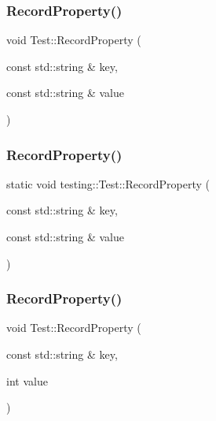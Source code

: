 \mbox{\label{classtesting_1_1_test_a1559ce1c83f56993b582650c091535a7}} 
\subsubsection{\texorpdfstring{RecordProperty()}{RecordProperty()}\hspace{0.1cm}{\footnotesize\ttfamily [1/6]}}
{\footnotesize\ttfamily void Test\+::\+Record\+Property (\begin{DoxyParamCaption}\item[{const std\+::string \&}]{key,  }\item[{const std\+::string \&}]{value }\end{DoxyParamCaption})\hspace{0.3cm}{\ttfamily [static]}}

\mbox{\label{classtesting_1_1_test_ae0448aec9e389fab70f6a75a59ff6aa2}} 
\subsubsection{\texorpdfstring{RecordProperty()}{RecordProperty()}\hspace{0.1cm}{\footnotesize\ttfamily [2/6]}}
{\footnotesize\ttfamily static void testing\+::\+Test\+::\+Record\+Property (\begin{DoxyParamCaption}\item[{const std\+::string \&}]{key,  }\item[{const std\+::string \&}]{value }\end{DoxyParamCaption})\hspace{0.3cm}{\ttfamily [static]}}

\mbox{\label{classtesting_1_1_test_a373da47b491b1e64e355d22d6ec99b5b}} 
\subsubsection{\texorpdfstring{RecordProperty()}{RecordProperty()}\hspace{0.1cm}{\footnotesize\ttfamily [3/6]}}
{\footnotesize\ttfamily void Test\+::\+Record\+Property (\begin{DoxyParamCaption}\item[{const std\+::string \&}]{key,  }\item[{int}]{value }\end{DoxyParamCaption})\hspace{0.3cm}{\ttfamily [static]}}

